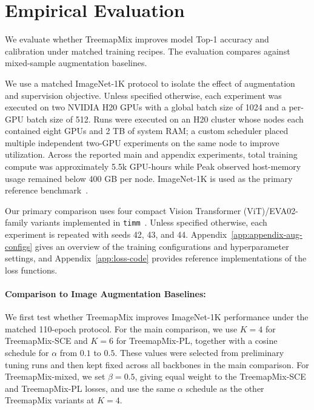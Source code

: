 \section{Empirical Evaluation}

We evaluate whether TreemapMix improves model Top-1 accuracy and calibration under
matched training recipes. The evaluation compares against mixed-sample
augmentation baselines.

We use a matched ImageNet-1K protocol to isolate the effect of
augmentation and supervision objective. Unless specified otherwise, each
experiment was executed on two NVIDIA H20 GPUs with a global batch size of 1024
and a per-GPU batch size of 512. Runs were executed on an H20 cluster whose
nodes each contained eight GPUs and 2 TB of system RAM; a custom scheduler
placed multiple independent two-GPU experiments on the same node to improve
utilization. Across the reported main and appendix experiments, total training
compute was approximately 5.5k GPU-hours while Peak observed host-memory usage
remained below 400 GB per node. ImageNet-1K is used as the primary
reference benchmark~\citep{dengImageNetLargescaleHierarchical2009}.

Our primary comparison uses four compact Vision Transformer (ViT)/EVA02-family variants implemented
in \texttt{timm}~\citep{fangEVA02VisualRepresentation2024}. Unless specified
otherwise, each experiment is repeated with seeds 42, 43, and 44.
Appendix~\ref{app:appendix-aug-configs} gives an overview of the training configurations and hyperparameter settings, and Appendix~\ref{app:loss-code} provides reference implementations of the loss functions.

\paragraph{Comparison to Image Augmentation Baselines:}

We first test whether TreemapMix improves ImageNet-1K performance under the
matched 110-epoch protocol. For the main comparison, we use $K=4$ for
TreemapMix-SCE and $K=6$ for TreemapMix-PL, together with a cosine schedule
for $\alpha$ from $0.1$ to $0.5$. These values were selected from preliminary
tuning runs and then kept fixed across all backbones in the main comparison.
For TreemapMix-mixed, we set $\beta=0.5$, giving equal weight to the
TreemapMix-SCE and TreemapMix-PL losses, and use the same $\alpha$ schedule
as the other TreemapMix variants at $K=4$.

